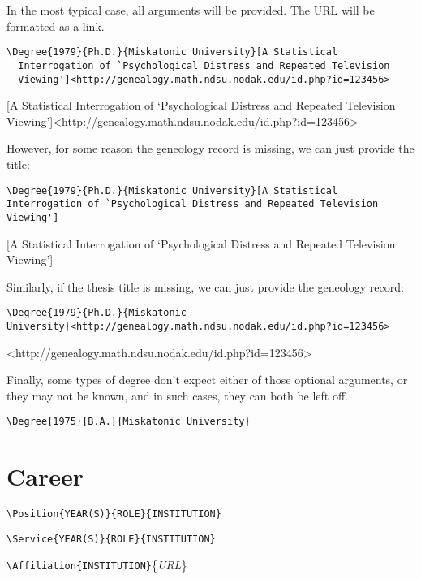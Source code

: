 \documentclass[letterpaper]{article}
\begin{document}
In the most typical case, all arguments will be provided.  The URL
will be formatted as a link.

\begin{verbatim}
\Degree{1979}{Ph.D.}{Miskatonic University}[A Statistical
  Interrogation of `Psychological Distress and Repeated Television
  Viewing']<http://genealogy.math.ndsu.nodak.edu/id.php?id=123456>
\end{verbatim}

[A Statistical
  Interrogation of `Psychological Distress and Repeated Television
  Viewing']<http://genealogy.math.ndsu.nodak.edu/id.php?id=123456>

However, for some reason the geneology record is missing, we
can just provide the title:

\begin{verbatim}
\Degree{1979}{Ph.D.}{Miskatonic University}[A Statistical
Interrogation of `Psychological Distress and Repeated Television
Viewing']
\end{verbatim}

[A Statistical
Interrogation of `Psychological Distress and Repeated Television
Viewing']

Similarly, if the thesis title is missing, we can just provide the
geneology record:

\begin{verbatim}
\Degree{1979}{Ph.D.}{Miskatonic
University}<http://genealogy.math.ndsu.nodak.edu/id.php?id=123456>
\end{verbatim}

<http://genealogy.math.ndsu.nodak.edu/id.php?id=123456>

Finally, some types of degree don't expect either of those optional
arguments, or they may not be known, and in such cases, they can both
be left off.

\begin{verbatim}
\Degree{1975}{B.A.}{Miskatonic University}
\end{verbatim}


\section{Career}

\begin{mdframed}
\texttt{\textbackslash Position\{YEAR(S)\}\{ROLE\}\{INSTITUTION\}}

\texttt{\textbackslash Service\{YEAR(S)\}\{ROLE\}\{INSTITUTION\}}

\texttt{\textbackslash Affiliation\{INSTITUTION\}}\{\emph{URL}\}
\end{mdframed}
\end{document}
